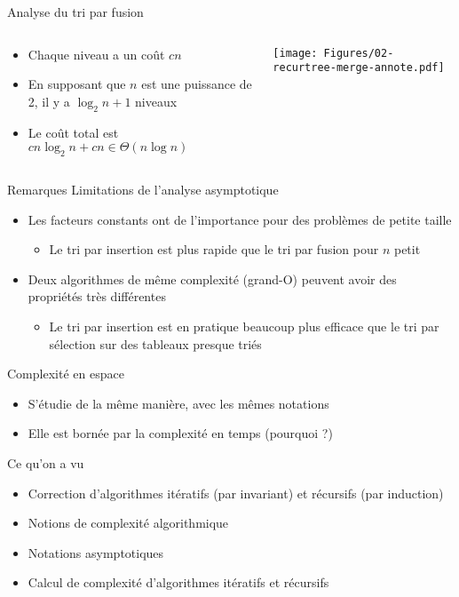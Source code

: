 \begin{frame}{Analyse du tri par fusion}
\begin{columns}
\begin{column}{5cm}
\begin{itemize}
\item Chaque niveau a un coût $cn$
\item En supposant que $n$ est une puissance de 2, il y a $\log_2 n+1$ niveaux
\item Le coût total est $cn\log_2 n+cn \in \Theta(n\log n)$
\end{itemize}
\end{column}
\begin{column}{7cm}
\centerline{\texttt{[image: Figures/02-recurtree-merge-annote.pdf]}}
\end{column}
\end{columns}
\end{frame}

\begin{frame}{Remarques}
Limitations de l'analyse asymptotique
\begin{itemize}
\item Les facteurs constants ont de l'importance pour des problèmes de petite taille
\begin{itemize}
\item Le tri par insertion est plus rapide que le tri par fusion pour $n$ petit
\end{itemize}
\item Deux algorithmes de même complexité (grand-O) peuvent avoir des propriétés très différentes
\begin{itemize}
\item Le tri par insertion est en pratique beaucoup plus efficace que
  le tri par sélection sur des tableaux presque triés
\end{itemize}
\end{itemize}

\bigskip

Complexité en espace
\begin{itemize}
\item S'étudie de la même manière, avec les mêmes notations
\item Elle est bornée par la complexité en temps (pourquoi ?)
\end{itemize}

\end{frame}

\begin{frame}{Ce qu'on a vu}

\begin{itemize}
\item Correction d'algorithmes itératifs (par invariant) et récursifs (par induction)
\item Notions de complexité algorithmique
\item Notations asymptotiques
\item Calcul de complexité d'algorithmes itératifs et récursifs
\end{itemize}

\end{frame}


